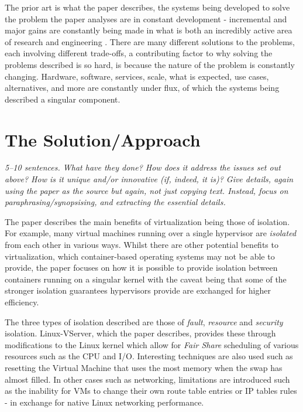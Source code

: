 \documentclass[11pt]{article}
\begin{document}
The prior art is what the paper describes, the systems being developed to solve
the problem the paper analyses are in constant development - incremental and
major gains are constantly being made in what is both an incredibly active area
of research and engineering \cite{GoogleScholarVirtualization}. There are many
different solutions to the problems, each involving different trade-offs, a
contributing factor to why solving the problems described is so hard, is
because the nature of the problem is constantly changing. Hardware, software,
services, scale, what is expected, use cases, alternatives, and more are
constantly under flux, of which the systems being described a singular
component.

\section*{The Solution/Approach}

\textsl{5--10 sentences. What have they done? How does it address the issues
set out above? How is it unique and/or innovative (if, indeed, it is)? Give
details, again using the paper as the source but again, not just copying text.
Instead, focus on paraphrasing/synopsising, and extracting the essential
details.}

The paper describes the main benefits of virtualization being those of
isolation. For example, many virtual machines running over a single hypervisor
are \textit{isolated} from each other in various ways. Whilst there are other
potential benefits to virtualization, which container-based operating systems
may not be able to provide, the paper focuses on how it is possible to provide
isolation between containers running on a singular kernel with the caveat being
that some of the stronger isolation guarantees hypervisors provide are exchanged
for higher efficiency.

The three types of isolation described are those of \textit{fault},
\textit{resource} and \textit{security} isolation. Linux-VServer, which the
paper describes, provides these through modifications to the Linux kernel which
allow for \textit{Fair Share} scheduling of various resources such as the CPU
and I/O. Interesting techniques are also used such as resetting the Virtual
Machine that uses the most memory when the swap has almost filled. In other
cases such as networking, limitations are introduced such as the inability for
VMs to change their own route table entries or IP tables rules - in exchange
for native Linux networking performance.
\end{document}
